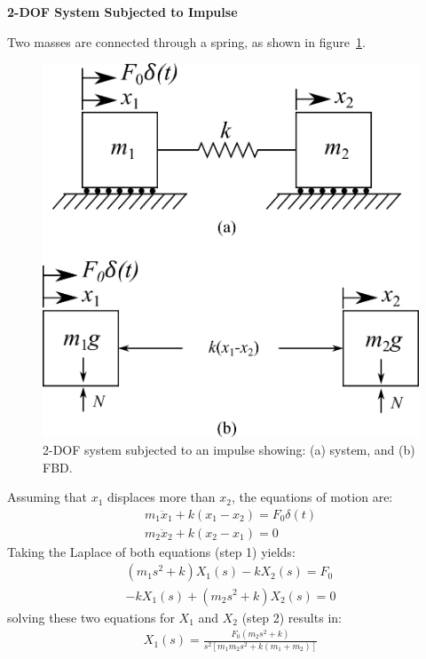 \documentclass[12pt,letter]{article}
\begin{document}
	
	\begin{example}
	\textbf{2-DOF System Subjected to Impulse}
	
	Two masses are connected through a spring, as shown in figure~\ref{fig:2-DOF-spring_mass_free}. 
	\begin{figure}[H]
		\centering
		\includegraphics[]{../figures/2-DOF-spring_mass_free.png}
		\caption{2-DOF system subjected to an impulse showing: (a) system, and (b) FBD.}
		\label{fig:2-DOF-spring_mass_free}
	\end{figure}
	Assuming that $x_1$ displaces more than $x_2$, the equations of motion are:
	\begin{eqnarray}
	m_1\ddot{x}_1 + k(x_1-x_2)  = F_0 \delta (t) \\
	m_2\ddot{x}_2 + k(x_2-x_1)  = 0  \nonumber
	\end{eqnarray}
	Taking the Laplace of both equations (step 1) yields:
	\begin{eqnarray}
	(m_1 s^2 +k)X_1(s) - k X_2(s) = F_0 \\
	-k X_1(s) + (m_2 s^2 + k) X_2(s) = 0  \nonumber
	\end{eqnarray}
	solving these two equations for $X_1$ and $X_2$ (step 2) results in:
	\begin{eqnarray}
	X_1(s) = \frac{F_0(m_2 s^2 +k)}{s^2 [m_1 m_2 s^2 + k (m_1 + m_2)]} \\

\end{eqnarray}
\end{example}
\end{document}
